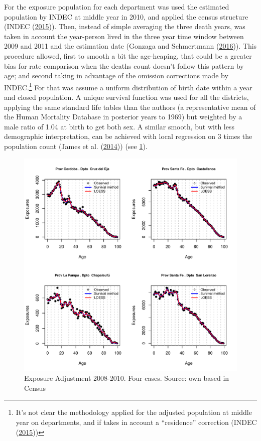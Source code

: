\documentclass[12pt,]{article}
\begin{document}
For the exposure population for each department was used the estimated
population by INDEC at middle year in 2010, and applied the census
structure (INDEC (\protect\hyperlink{ref-INDEC2015}{2015})). Then,
instead of simple averaging the three death years, was taken in account
the year-person lived in the three year time window between 2009 and
2011 and the estimation date (Gonzaga and Schmertmann
(\protect\hyperlink{ref-Gonzaga_Schmertmann_2016}{2016})). This
procedure allowed, first to smooth a bit the age-heaping, that could be
a greater bias for rate comparison when the deaths count doesn't follow
this pattern by age; and second taking in advantage of the omission
corrections made by INDEC.\footnote{It's not clear the methodology
  applied for the adjusted population at middle year on departments, and
  if takes in account a ``residence'' correction (INDEC
  (\protect\hyperlink{ref-INDEC2015}{2015}))} For that was assume a
uniform distribution of birth date within a year and closed population.
A unique survival function was used for all the districts, applying the
same standard life tables than the authors (a representative mean of the
Human Mortality Database in posterior years to 1969) but weighted by a
male ratio of 1.04 at birth to get both sex. A similar smooth, but with
less demographic interpretation, can be achieved with local regression
on 3 times the population count (James et al.
(\protect\hyperlink{ref-James2014}{2014})) (see \ref{fig:AdjExp}).

\begin{figure}

{\centering \includegraphics[width=0.7\linewidth]{plots/AdjExp} 

}

\caption{Exposure Adjustment 2008-2010. Four cases. Source: own based in Census}\label{fig:AdjExp}
\end{figure}
\end{document}
